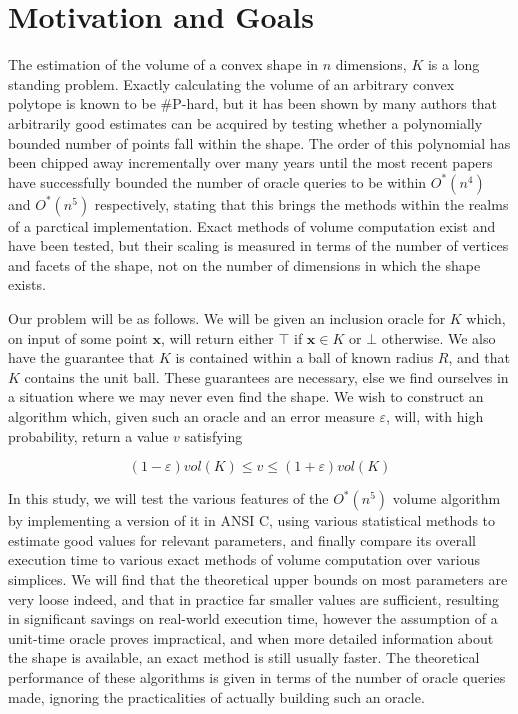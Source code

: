 \section{Motivation and Goals}

The estimation of the volume of a convex shape in $n$ dimensions, $K$ is a long standing problem. Exactly calculating the volume of an arbitrary convex polytope is known to be \#P-hard, %
 but it has been shown by many authors %
that arbitrarily good estimates can be acquired by testing whether a polynomially bounded number of points fall within the shape. The order of this polynomial has been chipped away incrementally over many years until the most recent papers %
have successfully bounded the number of oracle queries to be within $O^{*}(n^4)$ and $O^{*}(n^5)$ respectively, stating that this brings the methods within the realms of a parctical implementation. Exact methods of volume computation exist and have been tested, but their scaling is measured in terms of the number of vertices and facets of the shape, not on the number of dimensions in which the shape exists. 

Our problem will be as follows. We will be given an inclusion oracle for $K$ which, on input of some point $\bm{x}$, will return either $\top$ if $\bm{x} \in K$ or $\bot$ otherwise. We also have the guarantee that $K$ is contained within a ball of known radius $R$, and that $K$ contains the unit ball. These guarantees are necessary, else we find ourselves in a situation where we may never even find the shape. We wish to construct an algorithm which, given such an oracle and an error measure $\varepsilon$, will, with high probability, return a value $v$ satisfying

$$
(1-\varepsilon)vol(K) \leqslant v \leqslant (1+\varepsilon)vol(K)
$$

In this study, we will test the various features of the $O^{*}(n^5)$ volume algorithm by implementing a version of it in ANSI C, using various statistical methods to estimate good values for relevant parameters, and finally compare its overall execution time to various exact methods of volume computation over various simplices. We will find that the theoretical upper bounds on most parameters are very loose indeed, and that in practice far smaller values are sufficient, resulting in significant savings on real-world execution time, however the assumption of a unit-time oracle proves impractical, and when more detailed information about the shape is available, an exact method is still usually faster. The theoretical performance of these algorithms is given in terms of the number of oracle queries made, ignoring the practicalities of actually building such an oracle.

